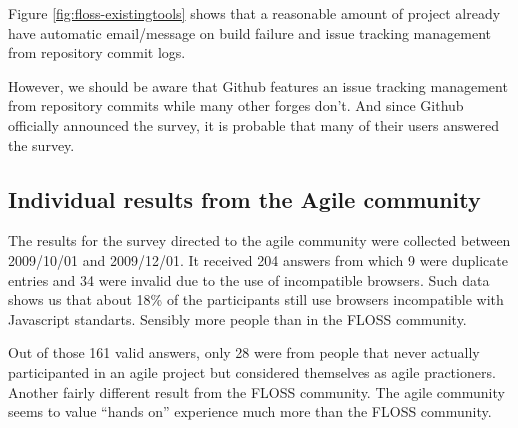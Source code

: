 \documentclass[lnbip]{svmultln}
\begin{document}
Figure \ref{fig:floss-existingtools} shows that a reasonable amount of
project already have automatic email/message on build failure and
issue tracking management from repository commit logs.

However, we should be aware that Github features an issue tracking
management from repository commits while many other forges don't. And
since Github officially announced the survey, it is probable that many
of their users answered the survey.

\subsection{Individual results from the Agile community}
\label{subsec:agile-results}

The results for the survey directed to the agile community were
collected between 2009/10/01 and 2009/12/01. It received 204 answers
from which 9 were duplicate entries and 34 were invalid due to the use
of incompatible browsers. Such data shows us that about 18\% of the
participants still use browsers incompatible with Javascript
standarts. Sensibly more people than in the FLOSS community.

Out of those 161 valid answers, only 28 were from people that never
actually participanted in an agile project but considered themselves
as agile practioners. Another fairly different result from the FLOSS
community. The agile community seems to value ``hands on'' experience
much more than the FLOSS community.
\end{document}
